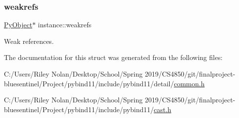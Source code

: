 \subsubsection{\texorpdfstring{weakrefs}{weakrefs}}
{\footnotesize\ttfamily \mbox{\hyperlink{_python27_2object_8h_aadc84ac7aed2cfa6f20c25f62bf3dac7}{Py\+Object}}$\ast$ instance\+::weakrefs}



Weak references. 



The documentation for this struct was generated from the following files\+:\begin{DoxyCompactItemize}
\item 
C\+:/\+Users/\+Riley Nolan/\+Desktop/\+School/\+Spring 2019/\+C\+S4850/git/finalproject-\/bluesentinel/\+Project/pybind11/include/pybind11/detail/\mbox{\hyperlink{detail_2common_8h}{common.\+h}}\item 
C\+:/\+Users/\+Riley Nolan/\+Desktop/\+School/\+Spring 2019/\+C\+S4850/git/finalproject-\/bluesentinel/\+Project/pybind11/include/pybind11/\mbox{\hyperlink{cast_8h}{cast.\+h}}\end{DoxyCompactItemize}
